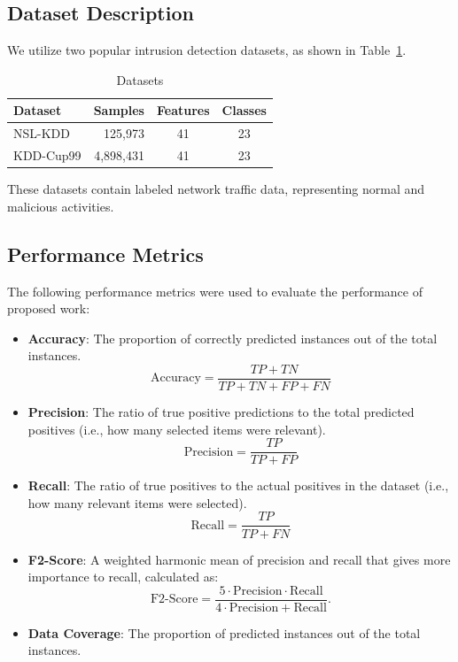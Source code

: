 \documentclass[pdflatex,sn-mathphys-num]{sn-jnl}%
\let\oldcaption\caption
\renewcommand{\caption}[1]{\oldcaption{\centering #1}}
\theoremstyle{thmstyleone}%
\theoremstyle{thmstyletwo}%
\theoremstyle{thmstylethree}%
\begin{document}
\subsection{Dataset Description}
We utilize two popular intrusion detection datasets, as shown in Table~\ref{tab:dataset}.
\begin{table}[ht!]
  \centering
  \caption{Datasets}
  \label{tab:dataset}
  \begin{tabular}{|l|r|c|c|}
    \hline
    \textbf{Dataset}       & \textbf{Samples} & \textbf{Features} & \textbf{Classes} \\ \hline
    NSL-KDD \cite{DATA1}   & 125,973          & 41                & 23               \\ \hline
    KDD-Cup99 \cite{DATA2} & 4,898,431        & 41                & 23               \\ \hline
  \end{tabular}
\end{table}

These datasets contain labeled network traffic data, representing normal and malicious activities.

\subsection{Performance Metrics}
The following performance metrics were used to evaluate the performance of proposed work:

\begin{itemize}
  \item \textbf{Accuracy}: The proportion of correctly predicted instances out of the total instances.
        \begin{equation}
          \text{Accuracy} = \frac{TP + TN}{TP + TN + FP + FN}
        \end{equation}
  \item \textbf{Precision}: The ratio of true positive predictions to the total predicted positives (i.e., how many selected items were relevant).
        \begin{equation}
          \text{Precision} = \frac{TP}{TP+FP}
        \end{equation}
  \item \textbf{Recall}: The ratio of true positives to the actual positives in the dataset (i.e., how many relevant items were selected).
        \begin{equation}
          \text{Recall} = \frac{TP}{TP+FN}
        \end{equation}
  \item \textbf{F2-Score}: A weighted harmonic mean of precision and recall that gives more importance to recall, calculated as:
        \begin{equation}
          \text{F2-Score} = \frac{5 \cdot \text{Precision} \cdot \text{Recall}}{4 \cdot \text{Precision} + \text{Recall}}.
        \end{equation}
  \item \textbf{Data Coverage}: The proportion of predicted instances out of the total instances.
\end{itemize}
\end{document}
